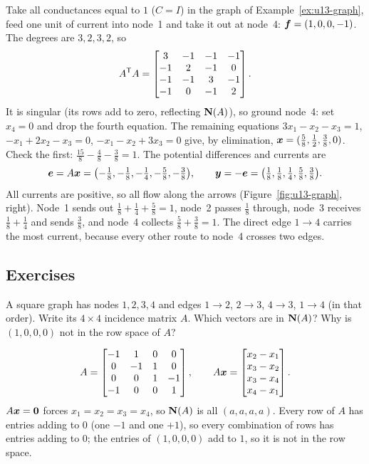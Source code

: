 \begin{example}\label{ex:u13-network}
Take all conductances equal to $1$ ($C=I$) in the graph of Example~\ref{ex:u13-graph}, feed one unit
of current into node~1 and take it out at node~4: $\boldsymbol{f}=(1,0,0,-1)$. The degrees are $3,2,3,2$, so
\[
A^{\mathsf{T}} A=\begin{bmatrix}3&-1&-1&-1\\-1&2&-1&0\\-1&-1&3&-1\\-1&0&-1&2\end{bmatrix}.
\]
It is singular (its rows add to zero, reflecting $\mathbf{N}(A)$), so ground node~4: set $x_4=0$ and
drop the fourth equation. The remaining equations $3x_1-x_2-x_3=1$, $-x_1+2x_2-x_3=0$,
$-x_1-x_2+3x_3=0$ give, by elimination, $\boldsymbol{x}=(\tfrac58,\tfrac12,\tfrac38,0)$. Check the first:
$\tfrac{15}{8}-\tfrac48-\tfrac38=1$. The potential differences and currents are
\[
\boldsymbol{e}=A\boldsymbol{x}=\bigl(-\tfrac18,-\tfrac18,-\tfrac14,-\tfrac58,-\tfrac38\bigr),\qquad
\boldsymbol{y}=-\boldsymbol{e}=\bigl(\tfrac18,\tfrac18,\tfrac14,\tfrac58,\tfrac38\bigr).
\]
All currents are positive, so all flow along the arrows (Figure~\ref{fig:u13-graph}, right). Node~1
sends out $\tfrac18+\tfrac14+\tfrac58=1$, node~2 passes $\tfrac18$ through, node~3 receives
$\tfrac18+\tfrac14$ and sends $\tfrac38$, and node~4 collects $\tfrac58+\tfrac38=1$. The direct edge
$1\to4$ carries the most current, because every other route to node~4 crosses two edges.
\end{example}

\subsection{Exercises}

\begin{exercise}\label{exr:u13-square}
A square graph has nodes $1,2,3,4$ and edges $1\to2$, $2\to3$, $4\to3$, $1\to4$ (in that order).
Write its $4\times4$ incidence matrix $A$. Which vectors are in $\mathbf{N}(A)$? Why is $(1,0,0,0)$ not in
the row space of $A$?
\end{exercise}
\begin{solution}
\[
A=\begin{bmatrix}-1&1&0&0\\0&-1&1&0\\0&0&1&-1\\-1&0&0&1\end{bmatrix},\qquad
A\boldsymbol{x}=\begin{bmatrix}x_2-x_1\\x_3-x_2\\x_3-x_4\\x_4-x_1\end{bmatrix}.
\]
$A\boldsymbol{x}=\boldsymbol{0}$ forces $x_1=x_2=x_3=x_4$, so $\mathbf{N}(A)$ is all $(a,a,a,a)$. Every row of $A$ has
entries adding to $0$ (one $-1$ and one $+1$), so every combination of rows has entries adding to
$0$; the entries of $(1,0,0,0)$ add to $1$, so it is not in the row space.
\end{solution}

